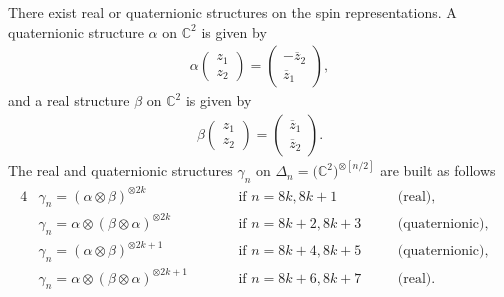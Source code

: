 \documentclass[10pt,a4paper]{amsart}
\numberwithin{equation}{section}
\begin{document}
There exist real or quaternionic structures on the spin representations. A quaternionic structure $\alpha$ on $\mathbb{C}^2$ is given by
\begin{gather*}\alpha\left(\begin{matrix}
z_1\\
z_2
 \end{matrix}
\right) = \left(\begin{matrix}
-\overline{z}_2\\
\overline{z}_1
 \end{matrix}\right),\end{gather*}
and a real structure $\beta$ on $\mathbb{C}^2$ is given by
\begin{gather*} \beta\left(\begin{matrix}
z_1\\
z_2
 \end{matrix}
\right) = \left(\begin{matrix}
\overline{z}_1\\
\overline{z}_2
 \end{matrix}\right).\end{gather*}
The real and quaternionic structures $\gamma_n$ on $\Delta_n=\big(\mathbb{C}^2\big)^{\otimes [n/2]}$ are built as follows
\begin{alignat*}{4}
& \gamma_n= (\alpha\otimes\beta)^{\otimes 2k} \qquad &&\text{if $n=8k,8k+1$} \quad && \text{(real)},& \\
& \gamma_n= \alpha\otimes(\beta\otimes\alpha)^{\otimes 2k} \qquad &&\text{if $n=8k+2,8k+3$}\quad && \text{(quaternionic)},& \\
& \gamma_n= (\alpha\otimes\beta)^{\otimes 2k+1} \qquad & &\text{if $n=8k+4,8k+5$}\quad &&\text{(quaternionic)},& \\
& \gamma_n= \alpha\otimes(\beta\otimes\alpha)^{\otimes 2k+1} \qquad &&\text{if $n=8k+6,8k+7$}\quad &&\text{(real)}.&
\end{alignat*}
\end{document}
